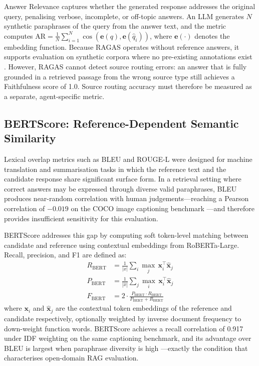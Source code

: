 Answer Relevance captures whether the generated response addresses the original query, penalising verbose, incomplete, or off-topic answers. An LLM generates $N$ synthetic paraphrases of the query from the answer text, and the metric computes $\text{AR} = \frac{1}{N} \sum_{i=1}^{N} \cos(\mathbf{e}(q), \mathbf{e}(\hat{q}_i))$, where $\mathbf{e}(\cdot)$ denotes the embedding function. Because RAGAS operates without reference answers, it supports evaluation on synthetic corpora where no pre-existing annotations exist \cite{es2023ragas}. However, RAGAS cannot detect source routing errors: an answer that is fully grounded in a retrieved passage from the wrong source type still achieves a Faithfulness score of 1.0. Source routing accuracy must therefore be measured as a separate, agent-specific metric.

\subsection*{BERTScore: Reference-Dependent Semantic Similarity}

Lexical overlap metrics such as BLEU and ROUGE-L were designed for machine translation and summarisation tasks in which the reference text and the candidate response share significant surface form. In a retrieval setting where correct answers may be expressed through diverse valid paraphrases, BLEU produces near-random correlation with human judgements—reaching a Pearson correlation of $-0.019$ on the COCO image captioning benchmark \cite{zhang2020bertscore}—and therefore provides insufficient sensitivity for this evaluation.

BERTScore \cite{zhang2020bertscore} addresses this gap by computing soft token-level matching between candidate and reference using contextual embeddings from RoBERTa-Large. Recall, precision, and F1 are defined as:
\begin{align}
R_{\text{BERT}} &= \frac{1}{|x|} \sum_{i} \max_{j}\, \mathbf{x}_i^\top \hat{\mathbf{x}}_j \\
P_{\text{BERT}} &= \frac{1}{|\hat{x}|} \sum_{j} \max_{i}\, \mathbf{x}_i^\top \hat{\mathbf{x}}_j \\
F_{\text{BERT}} &= 2 \cdot \frac{P_{\text{BERT}} \cdot R_{\text{BERT}}}{P_{\text{BERT}} + R_{\text{BERT}}}
\end{align}
where $\mathbf{x}_i$ and $\hat{\mathbf{x}}_j$ are the contextual token embeddings of the reference and candidate respectively, optionally weighted by inverse document frequency to down-weight function words. BERTScore achieves a recall correlation of 0.917 under IDF weighting on the same captioning benchmark, and its advantage over BLEU is largest when paraphrase diversity is high \cite{zhang2020bertscore}—exactly the condition that characterises open-domain RAG evaluation.

